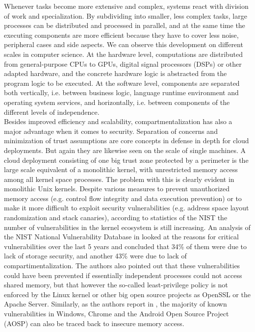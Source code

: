 Whenever tasks become more extensive and complex, systems react with division of work and specialization. By subdividing into smaller, less complex tasks, large processes can be distributed and processed in parallel, and at the same time the executing components are more efficient because they have to cover less noise, peripheral cases and side aspects. We can observe this development on different scales in computer science. At the hardware level, computations are distributed from general-purpose CPUs to GPUs, digital signal processors (DSPs) or other adapted hardware, and the concrete hardware logic is abstracted from the program logic to be executed. At the software level, components are separated both vertically, i.e. between business logic, language runtime environment and operating system services, and horizontally, i.e. between components of the different levels of independence. \\

Besides improved efficiency and scalability, compartmentalization has also a major advantage when it comes to security. Separation of concerns and minimization of trust assumptions are core concepts in defense in depth for cloud deployments.  But again they are likewise seen on the scale of single machines. A cloud deployment consisting of one big trust zone protected by a perimeter is the large scale equivalent of a monolithic kernel, with unrestricted memory access among all kernel space processes. The problem with this is clearly evident in monolithic Unix kernels. Despite various measures to prevent unauthorized memory access (e.g. control flow integrity and data execution prevention) or to make it more difficult to exploit security vulnerabilities (e.g. address space layout randomization and stack canaries), according to statistics of the NIST\cite{nvd} the number of vulnerabilities in the kernel ecosystem is still increasing. An analysis of the NIST National Vulnerability Database in \cite{mckee2022novel} looked at the reasons for critical vulnerabilities over the last 5 years and concluded that 34\% of them were due to lack of storage security, and another 43\% were due to lack of compartimentalization. The authors also pointed out that these vulnerabilities could have been prevented if essentially independent processes could not access shared memory, but that however the so-called least-privilege policy is not enforced by the Linux kernel or other big open source projects as OpenSSL or the Apache Server. 
Similarly, as the authors report in \cite{kirth2022pkru}, the majority of known vulnerabilities in Windows, Chrome and the Android Open Source Project (AOSP) can also be traced back to insecure memory access. \\

